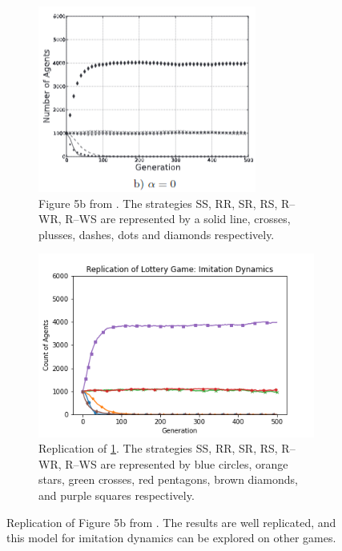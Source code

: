 \FloatBarrier 
\begin{figure}[!h]
  \begin{subfigure}[b]{0.45\textwidth}
    \includegraphics[width=\textwidth]{images/lottery2.png}
    \caption{Figure 5b from \cite{RN30}. The strategies SS, RR, SR, RS, R--WR, R--WS are represented by a solid line, crosses, plusses, dashes, dots and diamonds respectively. }
    \label{lottery2}
  \end{subfigure}
  \hfill
  \begin{subfigure}[b]{0.45\textwidth}
    \includegraphics[width=1.25\textwidth]{images/lottery2_me.png}
    \caption{Replication of \ref{lottery2}. The strategies SS, RR, SR, RS, R--WR, R--WS are represented by blue circles, orange stars, green crosses, red pentagons, brown diamonds, and purple squares respectively.}
    \label{lottery2_me}
  \end{subfigure}
  \caption{Replication of Figure 5b from \cite{RN30}. The results are well replicated, and this model for imitation dynamics can be explored on other games.} \label{lottery_comp1}
\end{figure} 
\FloatBarrier



